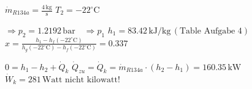 \( \dot{m}_{R134a} = \frac{4 \, \text{kg}}{\text{s}} \)  
\( T_2 = -22^\circ \text{C} \)  

\( \Rightarrow p_2 = 1.2192 \, \text{bar} \quad \Rightarrow p_1 \)  
\( h_1 = 83.42 \, \text{kJ/kg} \, (\text{Table Aufgabe 4}) \)  
\( x = \frac{h_1 - h_f(-22^\circ \text{C})}{h_g(-22^\circ \text{C}) - h_f(-22^\circ \text{C})} = 0.337 \)  

\( 0 = h_1 - h_2 + \dot{Q}_k \)  
\( \dot{Q}_{zu} = \dot{Q}_k = \dot{m}_{R134a} \cdot (h_2 - h_1) = 160.35 \, \text{kW} \)  
\( \dot{W}_k = 281 \, \text{Watt nicht kilowatt!} \)